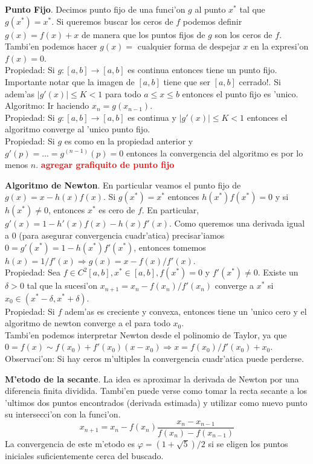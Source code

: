 \documentclass[a4paper,spanish]{article}
\newcommand{\Rv}{\marginpar{\textcolor{red}{$|$}}}
\newcommand{\note}[1]{\textcolor{red}{\textbf{#1}} \Rv}
\newcommand{\lthen}[0]{\Rightarrow}
\begin{document}
\textbf{Punto Fijo}. Decimos punto fijo de una funci'on $g$ al punto $x^*$ tal
que $g(x^*) = x^*$. Si queremos buscar los ceros de $f$ podemos definir 
$g(x) = f(x) + x$ de manera que los puntos fijos de $g$ son los ceros de $f$.
Tambi'en podemos hacer $g(x) = $ cualquier forma de despejar $x$ en la 
expresi'on $f(x) = 0$. \\
Propiedad: Si $g : [a,b] \to [a,b]$ es continua entonces tiene un punto fijo.
Importante notar que la imagen de $[a,b]$ tiene que ser $[a,b]$ cerrado!.
Si adem'as $|g'(x)| \leq K < 1$ para todo $a \leq x \leq b$ entonces el punto
fijo es 'unico. \\
Algoritmo: Ir haciendo $x_n = g(x_{n-1})$. \\
Propiedad: Si $g : [a,b] \to [a,b]$ es continua y $|g'(x)| \leq K < 1$
entonces el algoritmo converge al 'unico punto fijo. \\
Propiedad: Si $g$ es como en la propiedad anterior y 
$g'(p) = ... = g^{(n-1)}(p) = 0$ entonces la convergencia del algoritmo es por 
lo menos $n$.
\note{agregar grafiquito de punto fijo}

\textbf{Algoritmo de Newton}. 
En particular veamos el punto fijo de $g(x) = x-h(x)f(x)$. Si $g(x^*) = x^*$
entonces $h(x^*)f(x^*)=0$ y si $h(x^*) \neq 0$, entonces $x^*$ es cero de $f$.
En particular, $g'(x) = 1-h'(x)f(x)-h(x)f'(x)$. Como queremos una derivada
igual a $0$ (para asegurar convergencia cuadr'atica) precisar'iamos
$0 = g'(x^*) = 1-h(x^*)f'(x^*)$, entonces tomemos $h(x) = 1/f'(x) \lthen 
g(x) = x-f(x)/f'(x)$. \\
Propiedad: Sea $f \in C^2 [a,b], x^* \in [a,b], f(x^*) = 0$ y $f'(x^*) \neq
0$. Existe un $\delta>0$ tal que la sucesi'on $x_{n+1} = x_n - f(x_n)/f'(x_n)$ 
converge a $x^*$ si $x_0 \in (x^* - \delta, x^* + \delta)$. \\
Propiedad: Si $f$ adem'as es creciente y convexa, entonces tiene un 'unico
cero y el algoritmo de newton converge a el para todo $x_0$. \\
Tambi'en podemos interpretar Newton desde el polinomio de Taylor, ya que
$0 = f(x) \sim f(x_0) + f'(x_0)(x - x_0) \lthen x = f(x_0) / f'(x_0) + x_0$. \\
Observaci'on: Si hay ceros m'ultiples la convergencia cuadr'atica puede
perderse.

\textbf{M'etodo de la secante}.
La idea es aproximar la derivada de Newton por una diferencia finita dividida.
Tambi'en puede verse como tomar la recta secante a los 'ultimos dos puntos
encontrados (derivada estimada) y utilizar como nuevo punto su intersecci'on
con la funci'on.
$$x_{n+1} = x_n - f(x_n) \frac{x_n - x_{n-1}}{f(x_n) - f(x_{n-1})}$$
La convergencia de este m'etodo es $\varphi = (1+\sqrt{5})/2$ si se eligen los
puntos iniciales suficientemente cerca del buscado.
\end{document}
